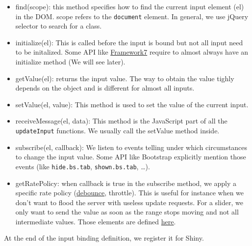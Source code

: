 \documentclass[]{book}
\newenvironment{Shaded}{\begin{snugshade}}{\end{snugshade}}
\newcommand{\AttributeTok}[1]{\textcolor[rgb]{0.77,0.63,0.00}{#1}}
\newcommand{\CommentTok}[1]{\textcolor[rgb]{0.56,0.35,0.01}{\textit{#1}}}
\newcommand{\KeywordTok}[1]{\textcolor[rgb]{0.13,0.29,0.53}{\textbf{#1}}}
\newcommand{\NormalTok}[1]{#1}
\newcommand{\OperatorTok}[1]{\textcolor[rgb]{0.81,0.36,0.00}{\textbf{#1}}}
\newcommand{\StringTok}[1]{\textcolor[rgb]{0.31,0.60,0.02}{#1}}
\newcommand{\VariableTok}[1]{\textcolor[rgb]{0.00,0.00,0.00}{#1}}
\providecommand{\tightlist}{%
  \setlength{\itemsep}{0pt}\setlength{\parskip}{0pt}}
\begin{document}
\begin{itemize}
\tightlist
\item
  find(scope): this method specifies how to find the current input element (el) in the DOM. scope refers to the \texttt{document} element. In general, we use jQuery selector to search for a class.
\item
  initialize(el): This is called before the input is bound but not all input need to be initalized. Some API like \href{https://framework7.io}{Framework7} require to almost always have an initialize method (We will see later).
\item
  getValue(el): returns the input value. The way to obtain the value tighly depends on the object and is different for almost all inputs.
\item
  setValue(el, value): This method is used to set the value of the current input.
\item
  receiveMessage(el, data): This method is the JavaScript part of all the \texttt{updateInput} functions. We usually call the setValue method inside.
\item
  subscribe(el, callback): We listen to events telling under which circumstances to change the input value. Some API like Bootstrap explicitly mention those events (like \texttt{hide.bs.tab}, \texttt{shown.bs.tab}, \ldots{}).
\item
  getRatePolicy: when callback is true in the subscribe method, we apply a specific rate policy (\href{https://davidwalsh.name/javascript-debounce-function}{debounce}, throttle). This is useful for instance when we don't want to flood the server with useless update requests. For a slider, we only want to send the value as soon as the range stops moving and not all intermediate values. Those elements are defined \href{https://github.com/rstudio/shiny/blob/master/srcjs/input_rate.js}{here}.
\end{itemize}

At the end of the input binding definition, we register it for Shiny.

\begin{Shaded}
\end{Shaded}
\end{document}
